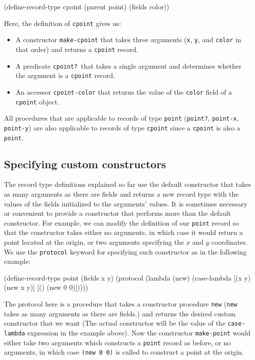 \documentclass[onecolumn, 12pt, twoside, openright, dvipdfm]{book}
\begin{document}
\begin{CodeInline}
(define-record-type cpoint
  (parent point)
  (fields color))
\end{CodeInline}

Here, the definition of \texttt{cpoint} gives us:
\begin{itemize}
\item A constructor \texttt{make-cpoint} that takes three arguments
(\texttt{x}, \texttt{y}, and \texttt{color} in that order) and returns a
\texttt{cpoint} record.
\item A predicate \texttt{cpoint?}\ that takes a single argument and
determines whether the argument is a \texttt{cpoint} record.
\item An accessor \texttt{cpoint-color} that returns the value of
the \texttt{color} field of a \texttt{cpoint} object.
\end{itemize}

All procedures that are applicable to records of type
\texttt{point} (\texttt{point?}, \texttt{point-x},
\texttt{point-y}) are also applicable to records of type
\texttt{cpoint} since a \texttt{cpoint} is also a \texttt{point}.

\subsection{Specifying custom constructors}

The record type definitions explained so far use the default
constructor that takes as many arguments as there are fields and
returns a new record type with the values of the fields initialized
to the arguments' values.  It is sometimes necessary or convenient
to provide a constructor that performs more than the default
constructor.  For example, we can modify the definition of our
\texttt{point} record so that the constructor takes either
no arguments, in which case it would return a point located at the
origin, or two arguments specifying the $x$ and $y$ coordinates.  We
use the \texttt{protocol} keyword for specifying such constructor as
in the following example:

\begin{CodeInline}
(define-record-type point
  (fields x y)
  (protocol
    (lambda (new)
      (case-lambda
        [(x y) (new x y)]
        [()    (new 0 0)]))))
\end{CodeInline}

The protocol here is a procedure that takes a constructor procedure
\texttt{new} (\texttt{new} takes as many arguments as there are
fields.) and returns the desired custom constructor that we want
(The actual constructor will be the value of the
\texttt{case-lambda} expression in the example above).
Now the constructor \texttt{make-point} would either take two
arguments which constructs a \texttt{point} record as before, or no
arguments, in which case \texttt{(new 0 0)} is called to construct a
point at the origin. 
\end{document}
